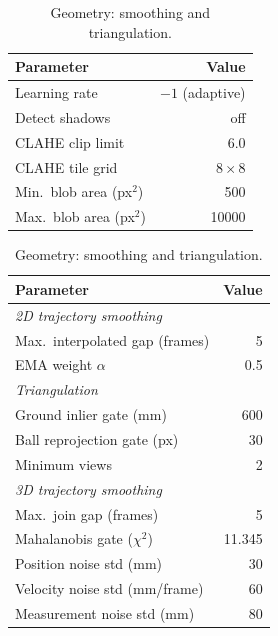 \begin{table}[H]
    \centering
    \small
    \begin{minipage}[t]{0.48\textwidth}
        \centering
        \caption{MOG2 background subtraction and preprocessing.}
        \label{tab:par-mog2}
        \begin{tabular}{lr}
            \toprule
            Parameter & Value \\
            \midrule
            Learning rate            & $-1$ (adaptive) \\
            Detect shadows           & off \\
            CLAHE clip limit         & 6.0 \\
            CLAHE tile grid          & $8\times8$ \\
            Min.\ blob area (px$^2$) & 500 \\
            Max.\ blob area (px$^2$) & 10000 \\
            \bottomrule
        \end{tabular}
    \end{minipage}
\hfill
    \begin{minipage}[t]{0.48\textwidth}
        \centering
        \caption{Geometry: smoothing and triangulation.}
        \label{tab:par-geometry}
        \begin{tabular}{lr}
            \toprule
            Parameter & Value \\
            \midrule
            \multicolumn{2}{l}{\textit{2D trajectory smoothing}} \\
            \quad Max.\ interpolated gap (frames) & 5 \\
            \quad EMA weight $\alpha$              & 0.5 \\
            \multicolumn{2}{l}{\textit{Triangulation}} \\
            \quad Ground inlier gate (mm)     & 600 \\
            \quad Ball reprojection gate (px) & 30 \\
            \quad Minimum views               & 2 \\
            \multicolumn{2}{l}{\textit{3D trajectory smoothing}} \\
            \quad Max.\ join gap (frames)       & 5 \\
            \quad Mahalanobis gate ($\chi^2$)   & 11.345 \\
            \quad Position noise std (mm)       & 30 \\
            \quad Velocity noise std (mm/frame) & 60 \\
            \quad Measurement noise std (mm)    & 80 \\
            \bottomrule
        \end{tabular}
    \end{minipage}
\end{table}

